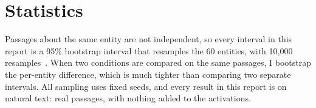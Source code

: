 \section{Statistics}

Passages about the same entity are not independent, so every interval in this report is a 95\% bootstrap
interval that resamples the 60 entities, with 10{,}000 resamples~\cite{efron1979bootstrap}. When two
conditions are compared on the same passages, I bootstrap the per-entity difference, which is much tighter
than comparing two separate intervals. All sampling uses fixed seeds, and every result in this report is on natural text: real passages, with nothing
added to the activations.
